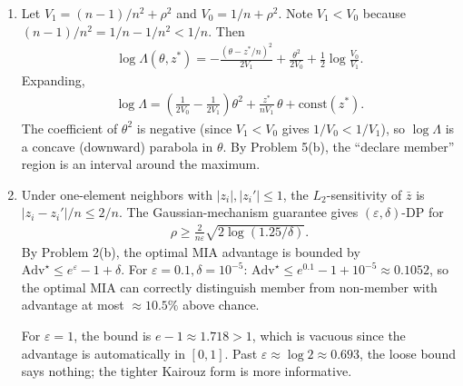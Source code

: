 \documentclass[12pt]{article}
\begin{document}
\begin{enumerate}
\begin{solution}
\begin{enumerate}
    \textbf{Under $b=1$:} $z^* = z_1$. Write $\bar z = z^*/n + (1/n)\sum_{i=2}^n z_i$. The sum on the right is independent of $z^*$ with distribution $\cN(0, n-1)$, so $(1/n)\sum_{i \ge 2} z_i \sim \cN(0, (n-1)/n^2)$. Therefore
    \begin{align*}
        \theta \mid z^* \sim \cN\!\left(\frac{z^*}{n},\ \frac{n-1}{n^2} + \rho^2\right).
    \end{align*}

    \item Let $V_1 = (n-1)/n^2 + \rho^2$ and $V_0 = 1/n + \rho^2$. Note $V_1 < V_0$ because $(n-1)/n^2 = 1/n - 1/n^2 < 1/n$. Then
    \begin{align*}
        \log\Lambda(\theta, z^*) = -\frac{(\theta - z^*/n)^2}{2V_1} + \frac{\theta^2}{2V_0} + \frac{1}{2}\log\frac{V_0}{V_1}.
    \end{align*}
    Expanding,
    \begin{align*}
        \log\Lambda = \left(\frac{1}{2V_0} - \frac{1}{2V_1}\right)\theta^2 + \frac{z^*}{n V_1}\,\theta + \mathrm{const}(z^*).
    \end{align*}
    The coefficient of $\theta^2$ is negative (since $V_1 < V_0$ gives $1/V_0 < 1/V_1$), so $\log\Lambda$ is a concave (downward) parabola in $\theta$. By Problem 5(b), the ``declare member'' region is an interval around the maximum.

    \item Under one-element neighbors with $|z_i|, |z_i'| \le 1$, the $L_2$-sensitivity of $\bar z$ is $|z_i - z_i'|/n \le 2/n$. The Gaussian-mechanism guarantee gives $(\varepsilon, \delta)$-DP for
    \begin{align*}
        \rho \ge \frac{2}{n\varepsilon}\sqrt{2\log(1.25/\delta)}.
    \end{align*}
    By Problem 2(b), the optimal MIA advantage is bounded by $\mathrm{Adv}^\star \le e^\varepsilon - 1 + \delta$. For $\varepsilon = 0.1, \delta = 10^{-5}$: $\mathrm{Adv}^\star \le e^{0.1} - 1 + 10^{-5} \approx 0.1052$, so the optimal MIA can correctly distinguish member from non-member with advantage at most $\approx 10.5\%$ above chance.

    For $\varepsilon = 1$, the bound is $e - 1 \approx 1.718 > 1$, which is vacuous since the advantage is automatically in $[0, 1]$. Past $\varepsilon \approx \log 2 \approx 0.693$, the loose bound says nothing; the tighter Kairouz form is more informative.
\end{enumerate}
\end{solution}


\end{enumerate}
\end{document}
